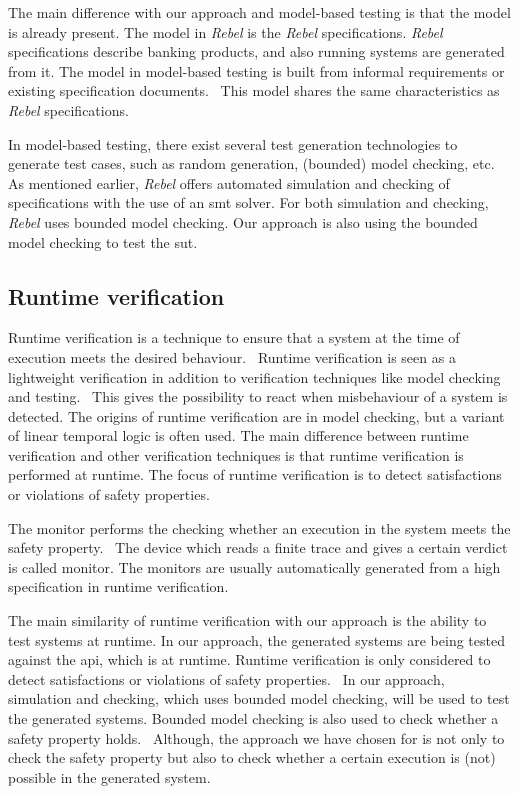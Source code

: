 The main difference with our approach and model-based testing is that the model
is already present. The model in \textit{Rebel} is the \textit{Rebel}
specifications. \textit{Rebel} specifications describe banking products, and
also running systems are generated from it. The model in model-based testing is
built from informal requirements or existing specification
documents.~\cite[p.~2]{utting2012taxonomy} This model
shares the same characteristics as \textit{Rebel} specifications.

In model-based testing, there exist several test generation technologies to
generate test cases, such as random generation, (bounded) model checking,
etc.~\cite[p.~8-9]{utting2012taxonomy}
As mentioned earlier, \textit{Rebel} offers automated simulation and checking of
specifications with the use of an \gls{smt} solver. For both simulation and
checking, \textit{Rebel} uses bounded model checking. Our approach is also using
the bounded model checking to test the \gls{sut}.

\subsection*{Runtime verification}

Runtime verification is a technique to ensure that a system at the time of
execution meets the desired
behaviour.~\cite{leucker2009brief, havelund2008verify, falcone2009runtime}
Runtime verification is seen as a lightweight verification in addition to
verification techniques like model checking and
testing.~\cite[p.~294]{leucker2009brief} This gives the possibility to react
when misbehaviour of a system is detected. The origins of runtime verification
are in model checking, but a variant of linear temporal logic is often used.
The main difference between runtime verification and other verification
techniques is that runtime verification is performed at runtime.
The focus of runtime verification is to detect satisfactions or violations of
safety properties.~\cite{leucker2009brief, falcone2009runtime}

The monitor performs the checking whether an execution in the system meets the
safety property.~\cite[p.~295]{leucker2009brief}
The device which reads a finite trace and gives a certain verdict is called
monitor. The monitors are usually automatically generated from a high
specification in runtime verification.~\cite{leucker2009brief, falcone2009runtime}

The main similarity of runtime verification with our approach is the ability to
test systems at runtime. In our approach, the generated systems are being tested
against the \gls{api}, which is at runtime.
Runtime verification is only considered to detect satisfactions or violations of
safety properties.~\cite{leucker2009brief, falcone2009runtime}
In our approach, simulation and checking, which uses bounded model checking,
will be used to test the generated systems. Bounded model checking is also used
to check whether a safety property holds.~\cite[p.~4]{stoel_storm_vinju_bosman_2016}
Although, the approach we have chosen for is
not only to check the safety property but also to check whether a certain
execution is (not) possible in the generated system.

